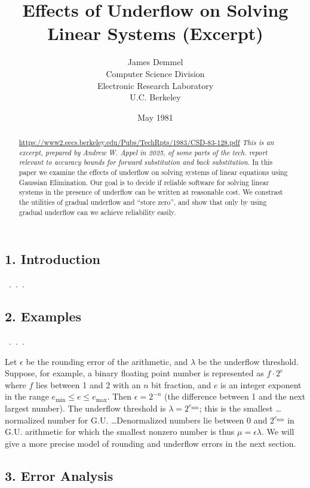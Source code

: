 \documentclass[a4paper]{article}
\title{Effects of Underflow on Solving Linear Systems (Excerpt)}
\author{James Demmel\\ Computer Science Division \\ Electronic Research Laboratory \\
  U.C. Berkeley}
\date{May 1981}
\begin{document}
\maketitle

\begin{abstract}
  \url{https://www2.eecs.berkeley.edu/Pubs/TechRpts/1983/CSD-83-128.pdf}\newline
  \emph{This is an excerpt, prepared by Andrew W. Appel in 2025, of some parts of the
  tech. report relevant to accuracy bounds for forward substitution and back substitution.}
  \newline
  In this paper we examine the effects of underflow on solving systems of linear equations using Gaussian Elimination.  Our goal is to decide if reliable software for solving linear
  systems in the presence of underflow can be written at reasonable cost.
  We constrast the utilities of gradual underflow and ``store zero'',
  and show that only by using gradual underflow can we achieve reliability easily.
  \end{abstract}

\subsection*{1. Introduction}

~.~.~.

\subsection*{2. Examples}

~.~.~.

Let $\epsilon$ be the rounding error of the arithmetic, and $\lambda$ be the
underflow threshold.  Suppose, for example, a binary floating point number is
represented as $f\cdot 2^e$ where $f$ lies between 1 and 2 with an $n$ bit fraction,
and $e$ is an integer exponent in the range $e_\mathrm{min} \le e \le e_\mathrm{max}$.
Then $\epsilon=2^{-n}$ (the difference between 1 and the next largest number).
The underflow threshold is $\lambda=2^{e_\mathrm{min}}$; this is the smallest \ldots
normalized number for G.U. \ldots Denormalized numbers lie between 0 and $2^{e_\mathrm{min}}$
in G.U. arithmetic for which the smallest nonzero number is thus $\mu = \epsilon \lambda$.
We will give a more precise model of rounding and underflow errors in the next section.

\subsection*{3. Error Analysis}
\end{document}
